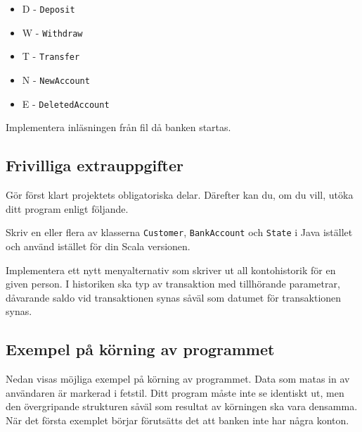 \begin{itemize}
\item D - \texttt{Deposit}
\item W - \texttt{Withdraw}
\item T - \texttt{Transfer}
\item N - \texttt{NewAccount}
\item E - \texttt{DeletedAccount}
\end{itemize}

\Subtask Implementera inläsningen från fil då banken startas.


\subsection{Frivilliga extrauppgifter}

Gör först klart projektets obligatoriska delar. Därefter kan du, om du vill, utöka ditt
program enligt följande.

\Task Skriv en eller flera av klasserna \texttt{Customer}, \texttt{BankAccount} och \texttt{State} i Java istället och använd istället för din Scala versionen.

\Task	Implementera ett nytt menyalternativ som skriver ut all kontohistorik för en given person. I historiken ska typ av transaktion med tillhörande parametrar, dåvarande saldo vid transaktionen synas såväl som datumet för transaktionen synas.

\subsection{Exempel på körning av programmet}

Nedan visas möjliga exempel på körning av programmet. Data som matas in av användaren är markerad i fetstil.
Ditt program måste inte se identiskt ut, men den övergripande strukturen såväl som resultat av körningen ska vara densamma.
När det första exemplet börjar förutsätts det att banken inte har några konton.

